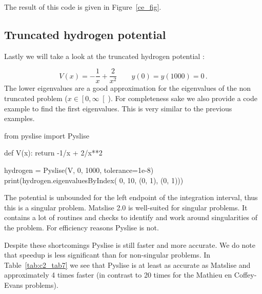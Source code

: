 The result of this code is given in Figure~\ref{ce_fig}.


\subsection{Truncated hydrogen potential}

Lastly we will take a look at the truncated hydrogen potential \cite{pryce_sltstpak_1999}:

\begin{equation}
  V(x) = -\frac{1}{x} + \frac{2}{x^2}  \qquad y(0)=y(1000)=0 \,. \label{thp}
\end{equation}
The lower eigenvalues are a good approximation for the eigenvalues of the non truncated problem ($x \in \left[0, \infty\right[$). For completeness sake we also provide a code example to find the first eigenvalues. This is very similar to the previous examples.

\begin{python}
  from pyslise import Pyslise

  def V(x):
    return -1/x + 2/x**2

  hydrogen = Pyslise(V, 0, 1000, tolerance=1e-8)
  print(hydrogen.eigenvaluesByIndex(
                      0, 10, (0, 1), (0, 1)))
\end{python}

The potential is unbounded for the left endpoint of the integration interval, thus this is a singular problem. Matslise 2.0 is well-suited for singular problems. It contains a lot of routines and checks to identify and work around singularities of the problem. For efficiency reasons Pyslise is not.

Despite these shortcomings Pyslise is still faster and more accurate. We do note that speedup is less significant than for non-singular problems. In Table~\ref{tab:c2_tab7} we see that Pyslise is at least as accurate as Matslise and approximately 4 times faster (in contrast to 20 times for the Mathieu en Coffey-Evans problems).

